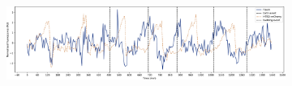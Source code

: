 \begin{figure}
  \centering
  \begin{subfigure}[htpb]{1.0\textwidth}
   \centering
   \includegraphics[width=\textwidth]{pyruvate_single_birth_plot_edit.pdf}
   \caption{
   }
   \label{fig:biology-pyruvate-single}


\end{subfigure}
\end{figure}
